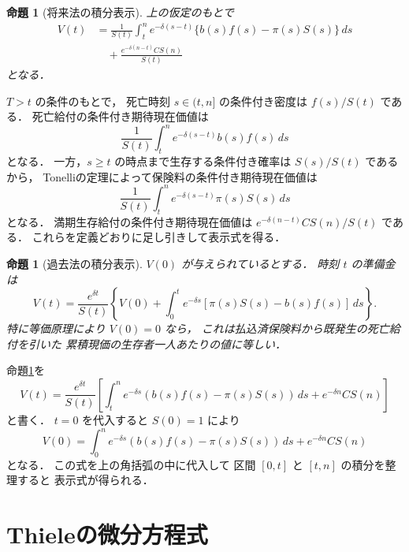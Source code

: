\documentclass[a5paper,10pt,onecolumn]{jsarticle}
\makeatletter
\theoremstyle{mathnotetheorem}
\newtheorem{proposition}[theorem]{命題}
\renewcommand{\proofname}{証明}
\renewenvironment{proof}[1][\proofname]{%
  \par\pushQED{\qed}\normalfont\topsep4\p@\@plus2\p@\relax
  \trivlist\item[\hskip\labelsep\bfseries #1]\ignorespaces
}{\popQED\endtrivlist\@endpefalse}
\makeatother
\begin{document}
\begin{proposition}[将来法の積分表示]\label{prop:prospective}
上の仮定のもとで
\begin{align*}
 V(t)
 &=\frac1{S(t)}
 \int_t^n e^{-\delta(s-t)}
 \{b(s)f(s)-\pi(s)S(s)\}\,ds\\
 &\quad+\frac{e^{-\delta(n-t)}C S(n)}{S(t)}
\end{align*}
となる．
\end{proposition}
\begin{proof}
$T>t$ の条件のもとで，
死亡時刻 $s\in(t,n]$ の条件付き密度は
$f(s)/S(t)$ である．
死亡給付の条件付き期待現在価値は
\[
 \frac1{S(t)}
 \int_t^n e^{-\delta(s-t)}b(s)f(s)\,ds
\]
となる．
一方，$s\ge t$ の時点まで生存する条件付き確率は
$S(s)/S(t)$ であるから，
Tonelliの定理によって保険料の条件付き期待現在価値は
\[
 \frac1{S(t)}
 \int_t^n e^{-\delta(s-t)}\pi(s)S(s)\,ds
\]
となる．
満期生存給付の条件付き期待現在価値は
$e^{-\delta(n-t)}C S(n)/S(t)$ である．
これらを定義どおりに足し引きして表示式を得る．
\end{proof}

\begin{proposition}[過去法の積分表示]\label{prop:retrospective}
$V(0)$ が与えられているとする．
時刻 $t$ の準備金は
\[
 V(t)=\frac{e^{\delta t}}{S(t)}
 \left\{
 V(0)+\int_0^t e^{-\delta s}
 [\pi(s)S(s)-b(s)f(s)]\,ds
 \right\}.
\]
特に等価原理により $V(0)=0$ なら，
これは払込済保険料から既発生の死亡給付を引いた
累積現価の生存者一人あたりの値に等しい．
\end{proposition}
\begin{proof}
命題\ref{prop:prospective}を
\[
 V(t)=\frac{e^{\delta t}}{S(t)}
 \left[
 \int_t^n e^{-\delta s}
 (b(s)f(s)-\pi(s)S(s))\,ds
 +e^{-\delta n}C S(n)
 \right]
\]
と書く．
$t=0$ を代入すると $S(0)=1$ により
\[
 V(0)=
 \int_0^n e^{-\delta s}
 (b(s)f(s)-\pi(s)S(s))\,ds
 +e^{-\delta n}C S(n)
\]
となる．
この式を上の角括弧の中に代入して
区間 $[0,t]$ と $[t,n]$ の積分を整理すると
表示式が得られる．
\end{proof}

\section{Thieleの微分方程式}
\end{document}
